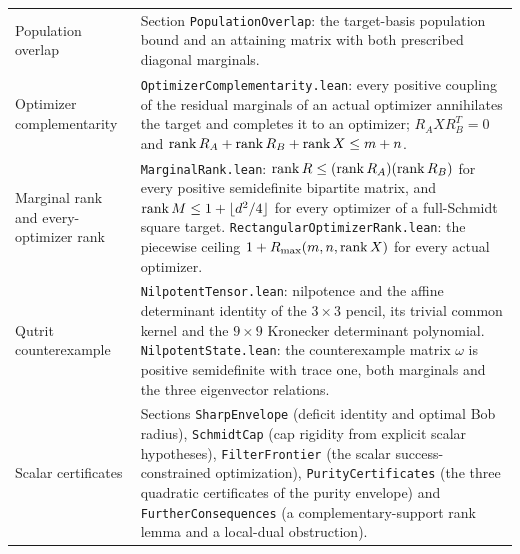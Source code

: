 \begin{center}
\begin{longtable}{p{}p{}}
Population overlap & Section \texttt{PopulationOverlap}: the target-basis
population bound and an attaining matrix with both prescribed diagonal
marginals.\\
Optimizer complementarity & \texttt{OptimizerComplementarity.lean}: every
positive coupling of the residual marginals of an actual optimizer
annihilates the target and completes it to an optimizer;
$R_AXR_B^T=0$ and $\operatorname{rank} R_A+\operatorname{rank} R_B+\operatorname{rank} X\le m+n$.\\
Marginal rank and every-optimizer rank &
\texttt{MarginalRank.lean}: $\operatorname{rank} R\le(\operatorname{rank} R_A)(\operatorname{rank} R_B)$ for every
positive semidefinite bipartite matrix, and
$\operatorname{rank} M\le1+\lfloor d^2/4\rfloor$ for every optimizer of a full-Schmidt
square target. \texttt{RectangularOptimizerRank.lean}: the piecewise
ceiling $1+R_{\max}(m,n,\operatorname{rank} X)$ for every actual optimizer.\\
Qutrit counterexample & \texttt{NilpotentTensor.lean}: nilpotence and the
affine determinant identity of the $3\times3$ pencil, its trivial common
kernel and the $9\times9$ Kronecker determinant polynomial.
\texttt{NilpotentState.lean}: the counterexample matrix $\omega$ is positive
semidefinite with trace one, both marginals and the three eigenvector
relations.\\
Scalar certificates & Sections \texttt{SharpEnvelope} (deficit identity and
optimal Bob radius), \texttt{SchmidtCap} (cap rigidity from explicit
scalar hypotheses), \texttt{FilterFrontier} (the scalar success-constrained
optimization), \texttt{PurityCertificates} (the three quadratic
certificates of the purity envelope) and \texttt{FurtherConsequences} (a
complementary-support rank lemma and a local-dual obstruction).\\
\bottomrule
\end{longtable}
\end{center}

